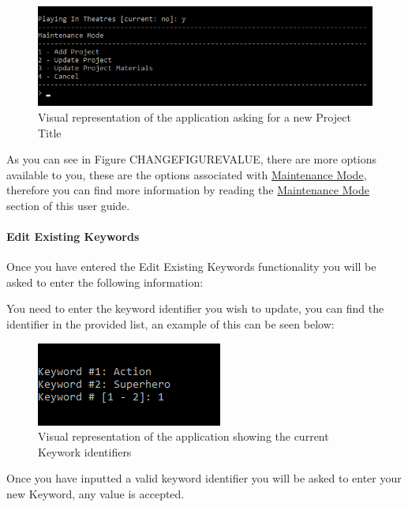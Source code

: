\documentclass[
  english,
  a4paper,
,tablecaptionabove
]{scrartcl}
\begin{document}
\begin{figure}
\centering
\includegraphics{images/user-guide/maintenance-mode/update-project-playing-in-theaters.png}
\caption{Visual representation of the application asking for a new
Project Title}
\end{figure}

As you can see in Figure CHANGEFIGUREVALUE, there are more options
available to you, these are the options associated with
\protect\hyperlink{using-maintenance-mode}{Maintenance Mode}, therefore
you can find more information by reading the
\protect\hyperlink{using-maintenance-mode}{Maintenance Mode} section of
this user guide.

\newpage

\hypertarget{edit-existing-keywords}{%
\paragraph{Edit Existing Keywords}\label{edit-existing-keywords}}

Once you have entered the Edit Existing Keywords functionality you will
be asked to enter the following information:

You need to enter the keyword identifier you wish to update, you can
find the identifier in the provided list, an example of this can be seen
below:

\begin{figure}
\centering
\includegraphics{images/user-guide/maintenance-mode/update-project-select-keyword.png}
\caption{Visual representation of the application showing the current
Keywork identifiers}
\end{figure}

Once you have inputted a valid keyword identifier you will be asked to
enter your new Keyword, any value is accepted.
\end{document}
